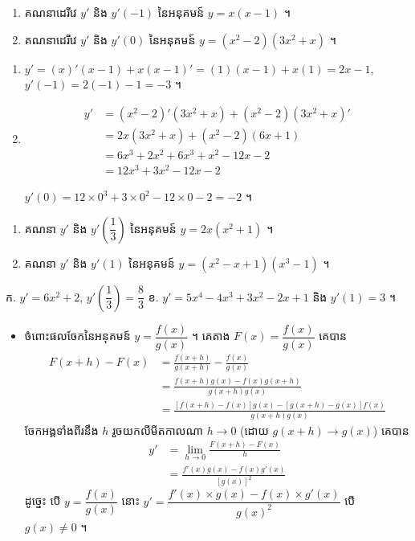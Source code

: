 \begin{example}[លំហាត់គំរូ]
\begin{enumerate}[a]
  \item គណនាដេរីវេ $y'$ និង $y'(-1)$ នៃអនុគមន៍ $y = x(x - 1)$ ។
  \item គណនាដេរីវេ $y'$ និង $y'(0)$ នៃអនុគមន៍ $y = (x^2 - 2)(3x^2 + x)$ ។
\end{enumerate}
\end{example}
\ans
\begin{enumerate}[a]
  \item $y' = (x)'(x - 1) + x(x - 1)' = (1)(x - 1) + x(1) = 2x - 1$, \ $y'(-1) = 2(-1) - 1 = -3$ ។
  \item \[ \begin{aligned}
y' &= (x^2 - 2)'(3x^2 + x) + (x^2 - 2)(3x^2 + x)'\\
&= 2x(3x^2 + x) + (x^2 - 2)(6x + 1)\\
&= 6x^3 + 2x^2 + 6x^3 + x^2 - 12x - 2\\
&= 12x^3 + 3x^2 - 12x - 2
\end{aligned} \]

  $y'(0) = 12\times 0^3 + 3\times 0^2 - 12\times 0 - 2 = -2$ ។
\end{enumerate}

\begin{pro}
\begin{enumerate}[a]
  \item គណនា $y'$ និង $y'\left(\dfrac{1}{3}\right)$ នៃអនុគមន៍ $y = 2x(x^2 + 1)$ ។
  \item គណនា $y'$ និង $y'(1)$ នៃអនុគមន៍ $y = (x^2 - x + 1)(x^3 - 1)$ ។
\end{enumerate}
\ans
ក. $y' = 6x^2 + 2$, $y'\left(\dfrac{1}{3}\right) = \dfrac{8}{3}$ \quad ខ. $y' = 5x^4 - 4x^3 + 3x^2 - 2x + 1$ និង $y'(1) = 3$ ។
\end{pro}

\begin{itemize}
  \item ចំពោះផលចែកនៃអនុគមន៍ $y = \dfrac{f(x)}{g(x)}$ ។ គេតាង $F(x) = \dfrac{f(x)}{g(x)}$ គេបាន
  \[ \begin{aligned} F(x + h) - F(x) &= \frac{f(x + h)}{g(x + h)} - \frac{f(x)}{g(x)}\\ &= \frac{f(x + h)g(x) - f(x)g(x + h)}{g(x + h)g(x)}\\ &= \frac{[f(x + h) - f(x)]g(x) - [g(x + h) - g(x)]f(x)}{g(x + h)g(x)} \end{aligned} \]
  ចែកអង្គទាំងពីរនឹង $h$ រួចយកលីមីតកាលណា $h \to 0$ (ដោយ $g(x + h) \to g(x)$) គេបាន
  \[
\begin{aligned}
y' &= \lim_{h \to 0}\frac{F(x + h) - F(x)}{h}\\
&= \frac{f'(x)g(x) - f(x)g'(x)}{[g(x)]^2}
\end{aligned}
\]
  ដូច្នេះ បើ $y = \dfrac{f(x)}{g(x)}$ នោះ $y' = \dfrac{f'(x)\times g(x) - f(x)\times g'(x)}{g(x)^2}$ បើ $g(x) \ne 0$ ។
\end{itemize}

